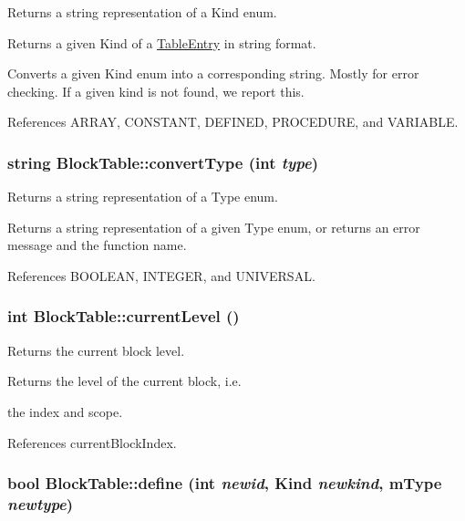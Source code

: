 Returns a string representation of a Kind enum. 

Returns a given Kind of a \hyperlink{structTableEntry}{TableEntry} in string format.

Converts a given Kind enum into a corresponding string. Mostly for error checking. If a given kind is not found, we report this. 

References ARRAY, CONSTANT, DEFINED, PROCEDURE, and VARIABLE.

\hypertarget{classBlockTable_a325649dd7ce1533f3e06520ca2b6bc0a}{
\subsubsection[{convertType}]{\setlength{\rightskip}{0pt plus 5cm}string BlockTable::convertType (int {\em type})}}
\label{classBlockTable_a325649dd7ce1533f3e06520ca2b6bc0a}


Returns a string representation of a Type enum. 

Returns a string representation of a given Type enum, or returns an error message and the function name. 

References BOOLEAN, INTEGER, and UNIVERSAL.

\hypertarget{classBlockTable_a445bc009943824d2611e64b10bcffecb}{
\subsubsection[{currentLevel}]{\setlength{\rightskip}{0pt plus 5cm}int BlockTable::currentLevel ()}}
\label{classBlockTable_a445bc009943824d2611e64b10bcffecb}


Returns the current block level. 

Returns the level of the current block, i.e.

the index and scope. 

References currentBlockIndex.

\hypertarget{classBlockTable_a7deb886fce54f404a28de69543cd837b}{
\subsubsection[{define}]{\setlength{\rightskip}{0pt plus 5cm}bool BlockTable::define (int {\em newid}, \/  {\bf Kind} {\em newkind}, \/  {\bf mType} {\em newtype})}}
\label{classBlockTable_a7deb886fce54f404a28de69543cd837b}


